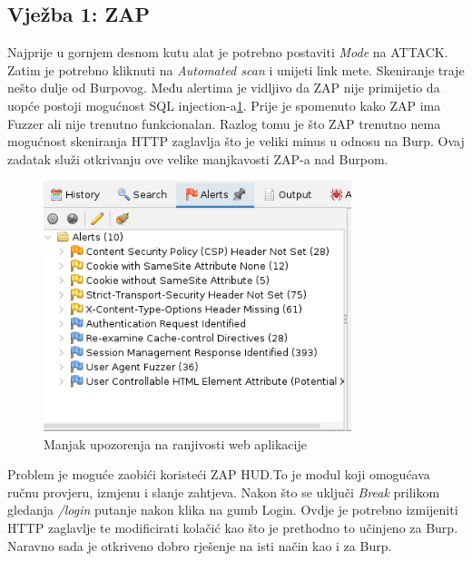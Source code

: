 \subsection{Vježba 1: ZAP}
Najprije u gornjem desnom kutu alat je potrebno postaviti \textit{Mode} na ATTACK. Zatim je potrebno kliknuti na \textit{Automated scan} i unijeti link mete.
Skeniranje traje nešto dulje od Burpovog. Među alertima je vidljivo da ZAP nije primijetio da uopće postoji mogućnost SQL injection-a\ref{slk:zap_vuln}. Prije je spomenuto kako ZAP ima Fuzzer ali nije trenutno funkcionalan. Razlog tomu je što ZAP trenutno nema mogućnost 
skeniranja HTTP zaglavlja što je veliki minus u odnosu na Burp.\cite{burp_to_zap} Ovaj zadatak služi otkrivanju ove velike manjkavosti ZAP-a nad Burpom.
\begin{figure}[H]
    \centering
    \includegraphics[width=0.8\textwidth]{slike/zap_sql_alerts.png}
    \caption{Manjak upozorenja na ranjivosti web aplikacije}
    \label{slk:zap_vuln}
\end{figure}

Problem je moguće zaobići koristeći ZAP HUD.\@ To je modul koji omogućava ručnu provjeru, izmjenu i slanje zahtjeva. Nakon što se uključi \textit{Break} prilikom gledanja \textit{/login} putanje nakon klika na gumb Login.
Ovdje je potrebno izmijeniti HTTP zaglavlje te modificirati kolačić kao što je prethodno to učinjeno za Burp. Naravno sada je otkriveno dobro rješenje na isti način kao i za Burp.
\newpage %
